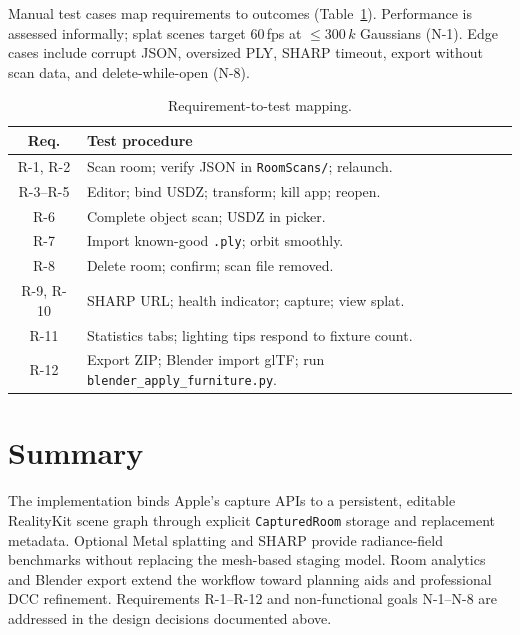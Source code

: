 Manual test cases map requirements to outcomes (Table~\ref{tab:test_map}). Performance is assessed informally; splat scenes target 60\,fps at $\leq 300\,k$ Gaussians (N-1). Edge cases include corrupt JSON, oversized PLY, SHARP timeout, export without scan data, and delete-while-open (N-8).

\begin{table}[htbp]
\centering
\caption{Requirement-to-test mapping.}
\label{tab:test_map}
\begin{tabular}{|c|p{}|}
\hline
\textbf{Req.} & \textbf{Test procedure} \\
\hline
R-1, R-2 & Scan room; verify JSON in \texttt{RoomScans/}; relaunch. \\
\hline
R-3--R-5 & Editor; bind USDZ; transform; kill app; reopen. \\
\hline
R-6 & Complete object scan; USDZ in picker. \\
\hline
R-7 & Import known-good \texttt{.ply}; orbit smoothly. \\
\hline
R-8 & Delete room; confirm; scan file removed. \\
\hline
R-9, R-10 & SHARP URL; health indicator; capture; view splat. \\
\hline
R-11 & Statistics tabs; lighting tips respond to fixture count. \\
\hline
R-12 & Export ZIP; Blender import glTF; run \texttt{blender\_apply\_furniture.py}. \\
\hline
\end{tabular}
\end{table}

\section{Summary}

The implementation binds Apple's capture APIs to a persistent, editable RealityKit scene graph through explicit \texttt{CapturedRoom} storage and replacement metadata. Optional Metal splatting and SHARP provide radiance-field benchmarks without replacing the mesh-based staging model. Room analytics and Blender export extend the workflow toward planning aids and professional DCC refinement. Requirements R-1--R-12 and non-functional goals N-1--N-8 are addressed in the design decisions documented above.
